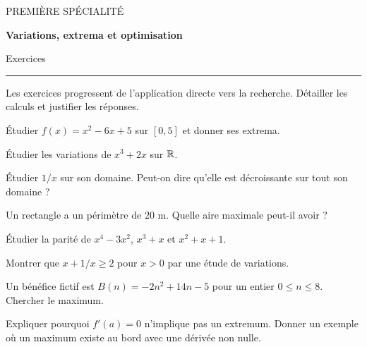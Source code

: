 \documentclass[11pt,a4paper]{article}
\begin{document}
{\small\color{Blue}PREMIÈRE SPÉCIALITÉ}\par{\LARGE\bfseries Variations, extrema et optimisation}\par{\large Exercices}\par\vspace{0.2cm}\hrule\vspace{0.4cm}
Les exercices progressent de l’application directe vers la recherche. Détailler les calculs et justifier les réponses.
\par\noindent\begin{minipage}{\linewidth}
Étudier $f(x)=x^2-6x+5$ sur $[0,5]$ et donner ses extrema.
\end{minipage}\par
\par\noindent\begin{minipage}{\linewidth}
Étudier les variations de $x^3+2x$ sur $\mathbb{R}$.
\end{minipage}\par
\par\noindent\begin{minipage}{\linewidth}
Étudier $1/x$ sur son domaine. Peut-on dire qu’elle est décroissante sur tout son domaine ?
\end{minipage}\par
\par\noindent\begin{minipage}{\linewidth}
Un rectangle a un périmètre de $20$ m. Quelle aire maximale peut-il avoir ?
\end{minipage}\par
\par\noindent\begin{minipage}{\linewidth}
Étudier la parité de $x^4-3x^2$, $x^3+x$ et $x^2+x+1$.
\end{minipage}\par
\par\noindent\begin{minipage}{\linewidth}
Montrer que $x+1/x\ge2$ pour $x>0$ par une étude de variations.
\end{minipage}\par
\par\noindent\begin{minipage}{\linewidth}
Un bénéfice fictif est $B(n)=-2n^2+14n-5$ pour un entier $0\le n\le8$. Chercher le maximum.
\end{minipage}\par
\par\noindent\begin{minipage}{\linewidth}
Expliquer pourquoi $f\prime(a)=0$ n’implique pas un extremum. Donner un exemple où un maximum existe au bord avec une dérivée non nulle.
\end{minipage}\par
\end{document}
